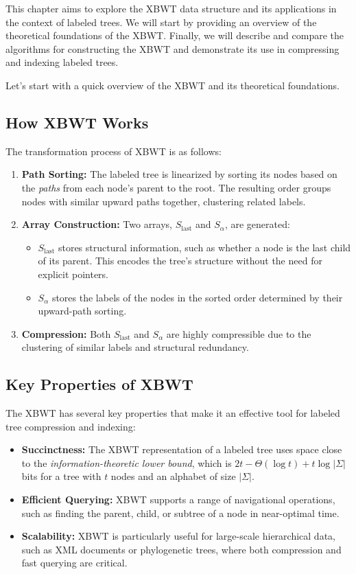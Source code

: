 This chapter aims to explore the XBWT data structure and its applications in the context of labeled trees. We will start by providing an overview of the theoretical foundations of the XBWT. Finally, we will describe and compare the algorithms for constructing the XBWT and demonstrate its use in compressing and indexing labeled trees.

Let's start with a quick overview of the XBWT and its theoretical foundations.

\subsection{How XBWT Works}
The transformation process of XBWT is as follows:
\begin{enumerate}
    \item \textbf{Path Sorting:} The labeled tree is linearized by sorting its nodes based on the \emph{paths} from each node's parent to the root. The resulting order groups nodes with similar upward paths together, clustering related labels.
    \item \textbf{Array Construction:} Two arrays, \( S_{\text{last}} \) and \( S_{\alpha} \), are generated:
    \begin{itemize}
        \item \( S_{\text{last}} \) stores structural information, such as whether a node is the last child of its parent. This encodes the tree’s structure without the need for explicit pointers.
        \item \( S_{\alpha} \) stores the labels of the nodes in the sorted order determined by their upward-path sorting.
    \end{itemize}
    \item \textbf{Compression:} Both \( S_{\text{last}} \) and \( S_{\alpha} \) are highly compressible due to the clustering of similar labels and structural redundancy.
\end{enumerate}

\subsection{Key Properties of XBWT}
The XBWT has several key properties that make it an effective tool for labeled tree compression and indexing:
\begin{itemize}
    \item \textbf{Succinctness:} The XBWT representation of a labeled tree uses space close to the \emph{information-theoretic lower bound}, which is \( 2t - \Theta(\log t) + t \log |\Sigma| \) bits for a tree with $t$ nodes and an alphabet of size $|\Sigma|$.
    \item \textbf{Efficient Querying:} XBWT supports a range of navigational operations, such as finding the parent, child, or subtree of a node in near-optimal time.
    \item \textbf{Scalability:} XBWT is particularly useful for large-scale hierarchical data, such as XML documents or phylogenetic trees, where both compression and fast querying are critical.
\end{itemize}

